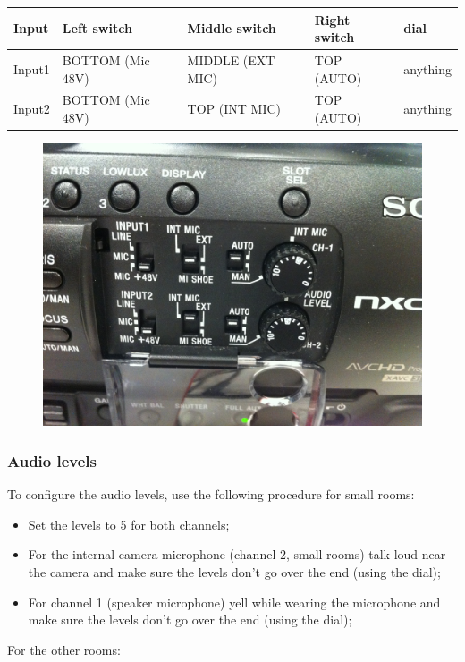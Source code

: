 \documentclass{article}
\begin{document}
\begin{tabular}{| l || l | l | l | l |}
Input & Left switch & Middle switch & Right switch & dial \\ \hline
Input1 & BOTTOM (Mic 48V) & MIDDLE (EXT MIC) & TOP (AUTO) & anything \\
Input2 & BOTTOM (Mic 48V) & TOP (INT MIC) & TOP (AUTO) & anything \\
\end{tabular}

\begin{figure}[H]
  \centering
\includegraphics[width = 120mm]{sony_audio_settings.jpg}
\end{figure}

\subsubsection{Audio levels}

To configure the audio levels, use the following procedure for small rooms:
\begin{itemize}
  \item Set the levels to 5 for both channels;
  \item For the internal camera microphone (channel 2, small rooms) talk loud near the camera and make sure the levels don't go over the end (using the dial);
  \item For channel 1 (speaker microphone) yell while wearing the microphone and make sure the levels don't go over the end (using the dial);
\end{itemize}

For the other rooms:
\end{document}
